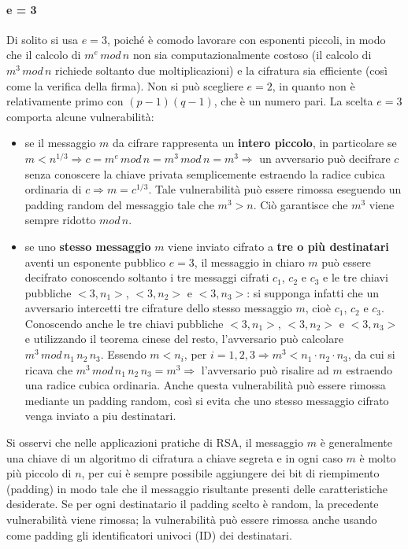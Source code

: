 \paragraph{e = 3}
Di solito si usa $e=3$, poiché è comodo lavorare con esponenti piccoli, in modo che il calcolo di $m^e \, mod \, n$ non sia computazionalmente costoso (il calcolo di $ m^3 \, mod \, n$ richiede soltanto due moltiplicazioni) e la cifratura sia efficiente (così come la verifica della firma). Non si può scegliere $e=2$, in quanto non è relativamente primo con $(p-1)(q-1)$, che è un numero pari. 
\newline \newline
La scelta $e=3$ comporta alcune vulnerabilità: 
\begin{itemize}
\item se il messaggio $m$ da cifrare rappresenta un \textbf{intero piccolo}, in particolare se $m < n^{1/3} \Rightarrow  c = m^e \, mod \, n = m^3 \, mod \, n = m^3 \Rightarrow$ un avversario può decifrare $c$ senza conoscere la chiave privata semplicemente estraendo la radice
cubica ordinaria di $c \Rightarrow m = c^{1/3}$. Tale vulnerabilità può essere rimossa eseguendo un padding random del messaggio tale che $m^3 > n$. Ciò garantisce che $m^3$ viene sempre ridotto $ mod \, n $.
\item se uno \textbf{stesso messaggio} $m$ viene inviato cifrato a \textbf{tre o più destinatari} aventi un esponente pubblico $e=3$, il messaggio in chiaro $m$ può essere decifrato conoscendo soltanto i tre messaggi cifrati $c_{1}$, $c_{2}$ e $c_{3}$ e le tre chiavi pubbliche $<3,n_{1}>$, $<3,n_{2}>$ e $<3,n_{3}>$: si supponga infatti che un avversario intercetti tre cifrature dello stesso messaggio $m$, cioè $c_{1}$, $c_{2}$ e $c_{3}$. Conoscendo anche le tre chiavi pubbliche $<3,n_{1}>$, $<3,n_{2}>$ e $<3,n_{3}>$ e utilizzando il teorema cinese del resto, l'avversario può calcolare  $m^3 \, mod \, n_{1} \, n_{2} \, n_{3}$. Essendo $m<n_{i}$, per $i=1,2,3 \Rightarrow m^3<n_{1} \cdot n_{2} \cdot n_{3}$, da cui si ricava che $m^3 \, mod \, n_{1} \, n_{2} \, n_{3} = m^3 \Rightarrow$ l'avversario può risalire ad $m$ estraendo una radice cubica ordinaria. Anche questa vulnerabilità può essere rimossa mediante un padding random, così si evita che uno stesso messaggio cifrato venga inviato a piu destinatari. 
\end{itemize}
Si osservi che nelle applicazioni pratiche di RSA, il messaggio $m$ è generalmente una chiave di un algoritmo di cifratura a chiave segreta e in ogni caso $m$ è molto più piccolo di $n$, per cui è sempre possibile aggiungere dei bit di riempimento (padding) in modo tale che il messaggio risultante presenti delle caratteristiche desiderate. Se per ogni destinatario il padding scelto è random, la precedente vulnerabilità viene rimossa; la vulnerabilità può essere rimossa anche usando come padding gli identificatori univoci (ID) dei destinatari. 
